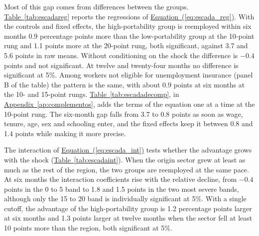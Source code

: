 \documentclass[11pt,a4paper]{article}
\begin{document}
\begin{table}[!htb]
\centering
\caption{Reemployment by relative decline of the origin sector: means}
\label{tab:escadamedias}

\end{table}

Most of this gap comes from differences between the groups. \hyperref[tab:escadareg]{Table~\ref*{tab:escadareg}} reports the regressions of \hyperref[eq:escada_reg]{Equation~(\ref*{eq:escada_reg})}. With the controls and fixed effects, the high-portability group is reemployed within six months 0.9 percentage points more than the low-portability group at the 10-point rung and 1.1 points more at the 20-point rung, both significant, against 3.7 and 5.6 points in raw means. Without conditioning on the shock the difference is $-0.4$ points and not significant. At twelve and twenty-four months no difference is significant at 5\%. Among workers not eligible for unemployment insurance (panel B of the table) the pattern is the same, with about 0.9 points at six months at the 10- and 15-point rungs. \hyperref[tab:escadadecomp]{Table~\ref*{tab:escadadecomp}}, in \hyperref[ap:complementos]{Appendix~\ref*{ap:complementos}}, adds the terms of the equation one at a time at the 10-point rung. The six-month gap falls from 3.7 to 0.8 points as soon as wage, tenure, age, sex and schooling enter, and the fixed effects keep it between 0.8 and 1.4 points while making it more precise.

\begin{table}[!htb]
\centering
\caption{Difference between the high- and low-portability groups by relative decline of the origin sector}
\label{tab:escadareg}

\end{table}

The interaction of \hyperref[eq:escada_int]{Equation~(\ref*{eq:escada_int})} tests whether the advantage grows with the shock (\hyperref[tab:escadaint]{Table~\ref*{tab:escadaint}}). When the origin sector grew at least as much as the rest of the region, the two groups are reemployed at the same pace. At six months the interaction coefficients rise with the relative decline, from $-0.4$ points in the 0 to 5 band to 1.8 and 1.5 points in the two most severe bands, although only the 15 to 20 band is individually significant at 5\%. With a single cutoff, the advantage of the high-portability group is 1.2 percentage points larger at six months and 1.3 points larger at twelve months when the sector fell at least 10 points more than the region, both significant at 5\%.
\end{document}
